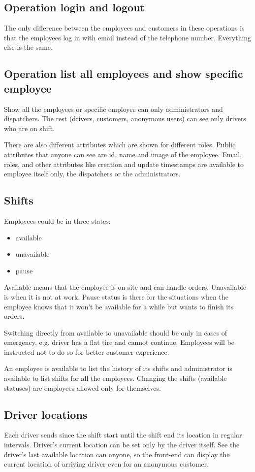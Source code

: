 		\subsection{Operation login and logout}
		The only difference between the employees and customers in these operations is that the employees log in with email instead of the telephone number. Everything else is the same.
		\subsection{Operation list all employees and show specific employee}
        Show all the employees or specific employee can only administrators and dispatchers. The rest (drivers, customers, anonymous users) can see only drivers who are on shift.

		There are also different attributes which are shown for different roles. Public attributes that anyone can see are id, name and image of the employee. Email, roles, and other attributes like creation and update timestamps are available to employee itself only, the dispatchers or the administrators.

		\subsection{Shifts}
			 Employees could be in three states: 
				\begin{itemize}
					\item available
					\item unavailable
					\item pause
				\end{itemize}
				Available means that the employee is on site and can handle orders. Unavailable is when it is not at work. Pause status is there for the situations when the employee knows that it won't be available for a while but wants to finish its orders.
				
				Switching directly from available to unavailable should be only in cases of emergency, e.g. driver has a flat tire and cannot continue. Employees will be instructed not to do so for better customer experience. 
				
				An employee is available to list the history of its shifts and administrator is available to list shifts for all the employees. Changing the shifts (available statuses) are employees allowed only for themselves.
		
		\subsection{Driver locations}
            Each driver sends since the shift start until the shift end its location in regular intervals. Driver's current location can be set only by the driver itself. See the driver's last available location can anyone, so the front-end can display the current location of arriving driver even for an anonymous customer. 
		
